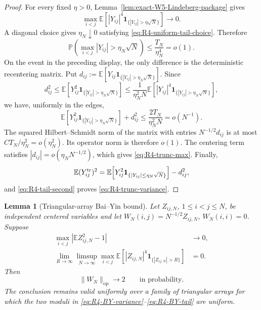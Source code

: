 \documentclass[11pt]{article}
\newtheorem{lemma}[theorem]{Lemma}
\theoremstyle{definition}
\theoremstyle{remark}
\newcommand{\E}{\mathbb E}
\newcommand{\op}{\mathrm{op}}
\newcommand{\one}{\mathbf 1}
\newcommand{\norm}[1]{\lVert #1\rVert}
\begin{document}
\begin{proof}
For every fixed \(\eta>0\),
Lemma~\ref{lem:exact-W5-Lindeberg-package} gives
\[
 \max_{i<j}
 \E\!\left[|Y_{ij}|^4
 \one_{\{|Y_{ij}|>\eta\sqrt N\}}\right]\longrightarrow0.
\]
A diagonal choice gives \(\eta_N\downarrow0\) satisfying
\eqref{eq:R4-uniform-tail-choice}.  Therefore
\[
 \mathbb P\!\left(\max_{i<j}|Y_{ij}|>\eta_N\sqrt N\right)
 \le \frac{T_N}{\eta_N^4}=o(1).
\]
On the event in the preceding display, the only difference is the
deterministic recentering matrix.  Put
\(d_{ij}:=\E[Y_{ij}\one_{\{|Y_{ij}|>\eta_N\sqrt N\}}]\).  Since
\[
 d_{ij}^2
 \le \E\!\left[Y_{ij}^2
       \one_{\{|Y_{ij}|>\eta_N\sqrt N\}}\right]
 \le \frac{1}{\eta_N^2N}
 \E\!\left[|Y_{ij}|^4
       \one_{\{|Y_{ij}|>\eta_N\sqrt N\}}\right],
\]
we have, uniformly in the edges,
\begin{equation}\label{eq:R4-tail-second}
 \E\!\left[Y_{ij}^2
 \one_{\{|Y_{ij}|>\eta_N\sqrt N\}}\right]
 +d_{ij}^2
 \le \frac{2T_N}{\eta_N^2N}
 =o(N^{-1}).
\end{equation}
The squared Hilbert--Schmidt norm of the matrix with entries
\(N^{-1/2}d_{ij}\) is at most
\(C T_N/\eta_N^2=o(\eta_N^2)\).  Its operator norm is therefore \(o(1)\).
The centering term satisfies
\(|d_{ij}|=o(\eta_NN^{-1/2})\), which gives
\eqref{eq:R4-trunc-max}.  Finally,
\[
 \E(Y_{ij}^{\rm tr})^2
 =\E\!\left[Y_{ij}^2
       \one_{\{|Y_{ij}|\le\eta_N\sqrt N\}}\right]-d_{ij}^2,
\]
and \eqref{eq:R4-tail-second} proves
\eqref{eq:R4-trunc-variance}.
\end{proof}

\begin{lemma}[Triangular-array Bai--Yin bound]
\label{lem:R4-triangular-Bai-Yin}
Let \(Z_{ij,N}\), \(1\le i<j\le N\), be independent centered variables and
let \(W_N(i,j)=N^{-1/2}Z_{ij,N}\), \(W_N(i,i)=0\).  Suppose
\begin{align}
 \max_{i<j}\left|\E Z_{ij,N}^2-1\right|&\longrightarrow0,
 \label{eq:R4-BY-variance}\\
 \lim_{R\to\infty}\limsup_{N\to\infty}
 \max_{i<j}
 \E\!\left[|Z_{ij,N}|^4
 \one_{\{|Z_{ij,N}|>R\}}\right]&=0.
 \label{eq:R4-BY-tail}
\end{align}
Then
\begin{equation}\label{eq:R4-BY-conclusion}
 \norm{W_N}_{\op}\longrightarrow2
 \qquad\text{in probability}.
\end{equation}
The conclusion remains valid uniformly over a family of triangular arrays
for which the two moduli in
\eqref{eq:R4-BY-variance}--\eqref{eq:R4-BY-tail} are uniform.
\end{lemma}
\end{document}
